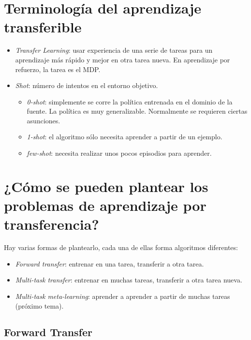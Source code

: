 \section{Terminología del aprendizaje transferible}%
\label{sec:terminología_del_aprendizaje_transferible}

\begin{itemize}
    \item \textit{Transfer Learning}: usar experiencia de una serie de tareas para un
        aprendizaje más rápido y mejor en otra tarea nueva. En aprendizaje por refuerzo, la
        tarea es el MDP.
    \item \textit{Shot}: número de intentos en el entorno objetivo.
        \begin{itemize}
            \item \textit{0-shot}: simplemente se corre la política entrenada en el
                dominio de la fuente. La política es muy generalizable. Normalmente se
                requieren ciertas asunciones.
            \item \textit{1-shot}: el algoritmo sólo necesita aprender a partir de un
                ejemplo.
            \item \textit{few-shot}: necesita realizar unos pocos episodios para aprender.
        \end{itemize}
\end{itemize}

\section{¿Cómo se pueden plantear los problemas de aprendizaje por transferencia?}%
\label{sec:_cómo_se_pueden_plantear_los_problemas_de_aprendizaje_por_transferencia_}

Hay varias formas de plantearlo, cada una de ellas forma algoritmos diferentes:
\begin{itemize}
    \item \textit{Forward transfer}: entrenar en una tarea, transferir a otra tarea.
    \item \textit{Multi-task transfer}: entrenar en muchas tareas, transferir a otra
        tarea nueva.
    \item \textit{Multi-task meta-learning}: aprender a aprender a partir de muchas tareas
        (próximo tema).
\end{itemize}

\subsection{Forward Transfer}%
\label{sub:forward_transfer}

